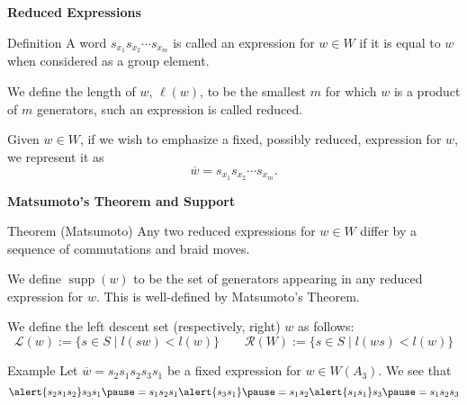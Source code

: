 \documentclass{beamer}
\newcommand{\w}{\overline{w}}
\DeclareMathOperator{\supp}{supp}
\newcommand{\RD}{\mathcal{R}}
\begin{document}
\begin{frame}{\textbf{Reduced Expressions}}

\begin{block}{Definition}
A word $s_{x_1}s_{x_2}\cdots s_{x_m}$ is called an \alert
{expression} for $w\in W$ if it is equal to $w$ when considered as 
a group element.

\vspace{1em}
\pause

We define the \alert{length} of $w$, $\ell(w)$, to be the smallest $m$ for which $w$ is a product of $m$ generators, such an expression is called \alert{reduced}.

\vspace{1em}
\pause

Given $w \in W$, if we wish to emphasize a fixed, possibly reduced, 
expression for $w$, we represent it as
\[
\w=s_{x_1}s_{x_2}\cdots s_{x_m}.
\]
\end{block}

\end{frame}


\begin{frame}{\textbf{Matsumoto's Theorem and Support}}
\begin{block}{Theorem (Matsumoto)}
Any two reduced expressions for $w\in W$ differ by a sequence of commutations and braid moves.
\end{block}	

\pause

\begin{definition}
	We define $\supp(w)$ to be the set of generators appearing in any reduced expression for $w$. This is well-defined by Matsumoto's Theorem.
\end{definition}

\begin{definition}
 We define the \alert{left descent set} (respectively, right) $w$ as follows:
\[\mathcal{L}(w):=\{s \in S \mid l(sw) < l(w)\} \qquad \RD(W):=\{s \in S \mid l(ws)< l(w)\}\]
\end{definition}

\pause

\begin{block}{Example}
Let $\w=s_2s_1s_2s_3s_1$ be a fixed expression for $w \in W(A_3)$. We see that
\[\alert{s_2s_1s_2}s_3s_1 \pause =s_1s_2s_1\alert{s_3s_1} \pause =s_1s_2\alert{s_1s_1}s_3\pause=s_1s_2s_3\]	
\end{block}

\end{frame}
\end{document}
